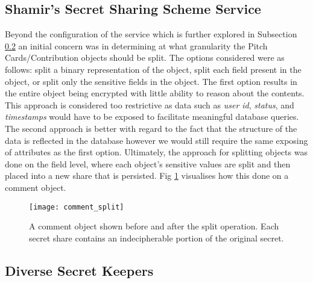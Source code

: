 \subsection{Shamir's Secret Sharing Scheme Service}
Beyond the configuration of the service which is further explored in Subsection \ref{SS:diverse_secret_keepers} an initial concern was in determining at what granularity the Pitch Cards/Contribution objects should be split. The options considered were as follows: split a binary representation of the object, split each field present in the object, or split only the sensitive fields in the object. The first option results in the entire object being encrypted with little ability to reason about the contents. This approach is considered too restrictive as data such as \textit{user id}, \textit{status}, and \textit{timestamps} would have to be exposed to facilitate meaningful database queries. The second approach is better with regard to the fact that the structure of the data is reflected in the database however we would still require the same exposing of attributes as the first option. Ultimately, the approach for splitting objects was done on the field level, where each object's sensitive values are split and then placed into a new share that is persisted. Fig \ref{fig:comment_split} visualises how this done on a comment object. 

\begin{figure}[ht]
    \centering
    \texttt{[image: comment\_split]}
    \caption{A comment object shown before and after the split operation. Each secret share contains an indecipherable portion of the original secret.}
    \label{fig:comment_split}
\end{figure}

\subsection{Diverse Secret Keepers}\label{SS:diverse_secret_keepers}

